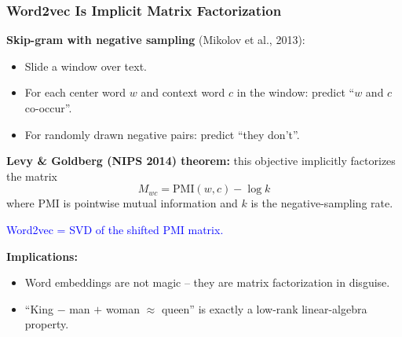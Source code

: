\documentclass[notes,11pt, aspectratio=169]{beamer}
\begin{document}
\begin{frame}
\frametitle{Word2vec Is Implicit Matrix Factorization}

\textbf{Skip-gram with negative sampling} (Mikolov et al., 2013):
\begin{itemize}
    \item Slide a window over text.
    \item For each center word $w$ and context word $c$ in the window: predict ``$w$ and $c$ co-occur''.
    \item For randomly drawn negative pairs: predict ``they don't''.
\end{itemize}

\vspace{8pt}
\textbf{Levy \& Goldberg (NIPS 2014) theorem:} this objective implicitly factorizes the matrix
\[
    M_{wc} = \mathrm{PMI}(w, c) - \log k
\]
where PMI is pointwise mutual information and $k$ is the negative-sampling rate.

\vspace{8pt}
\textcolor{blue}{Word2vec = SVD of the shifted PMI matrix.}

\vspace{4pt}
\textbf{Implications:}
\begin{itemize}
    \item Word embeddings are not magic -- they are matrix factorization in disguise.
    \item ``King $-$ man $+$ woman $\approx$ queen'' is exactly a low-rank linear-algebra property.
\end{itemize}
\end{frame}
\end{document}

